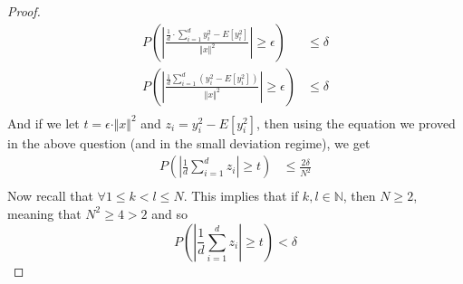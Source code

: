 \documentclass[11pt]{article}
\begin{document}
\begin{enumerate}
\begin{proof}
\begin{align*}
		P \left(\left| \frac{\frac{1}{d} \cdot \sum_{i=1}^d y_i^2 - E[y_i^2]}{\Vert x \Vert^2} \right| \ge \epsilon \right) &\le \delta \\
		P \left(\left| \frac{\frac{1}{d} \sum_{i=1}^d \left(y_i^2 - E \left[y_i^2 \right] \right)}{\Vert x \Vert^2} \right| \ge \epsilon \right) &\le \delta \\
	\end{align*}
	And if we let $t = \epsilon \cdot \Vert x \Vert^2$ and $z_i = y_i^2 - E \left[y_i^2 \right]$, then using the equation we proved in the above question (and in the small deviation regime), we get
	\begin{align*}
		P \left(\left|\frac{1}{d}\sum_{i=1}^d z_i \right| \ge t \right) &\le \frac{2 \delta}{N^2} \\
	\end{align*}
	Now recall that $\forall 1 \le k < l \le N$. This implies that if $k, l \in \mathbb{N}$, then $N \ge 2$, meaning that $N^2 \ge 4 > 2$ and so
	\begin{equation*}
		P \left(\left|\frac{1}{d}\sum_{i=1}^d z_i \right| \ge t \right) < \delta
	\end{equation*}
	\end{proof}
\end{enumerate}
\begin{center}
\end{center}
\end{document}
